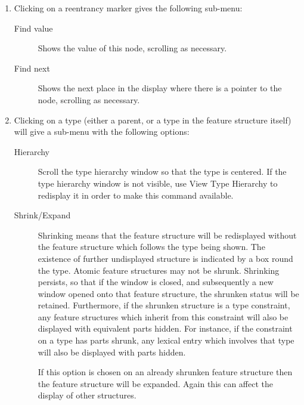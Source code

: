 \documentclass[12pt]{report}
\newcommand{\lkbmenucommand}{{\bf}}
\begin{document}
\begin{enumerate}
\item Clicking on a reentrancy marker gives the following sub-menu:
\begin{description}
\item[Find value] Shows the value of this node, scrolling as necessary.
\item[Find next] Shows the next place in the display where there is 
a pointer to the node, scrolling as necessary.
\end{description}
\item Clicking on a type (either a parent, or a type in the feature
structure itself) will give a sub-menu with the following options:
\begin{description}
\item[Hierarchy] Scroll the type hierarchy window so
that the type is centered.  If the type hierarchy window is not visible,
use {\lkbmenucommand View Type Hierarchy} to redisplay it in order to make
this command available.
\item[Shrink/Expand] 
Shrinking means that the feature structure will be redisplayed without
the feature structure which follows the type being shown.  The
existence of further undisplayed structure is indicated by a box round
the type.  Atomic feature structures may not be shrunk.  Shrinking
persists, so that if the
window is closed, and subsequently a new window opened onto that
feature structure, the shrunken status will be retained.  Furthermore,
if the shrunken structure is a type constraint,
any feature structures which inherit
from this constraint will also be displayed with equivalent
parts hidden.  For instance, if the constraint on a type has
parts shrunk, any lexical entry which involves that type
will also be
displayed with parts hidden. 

If this option is chosen on an already shrunken feature structure then
the feature structure will be expanded.  Again this can affect the
display of other structures.


\end{description}
\end{enumerate}
\end{document}
